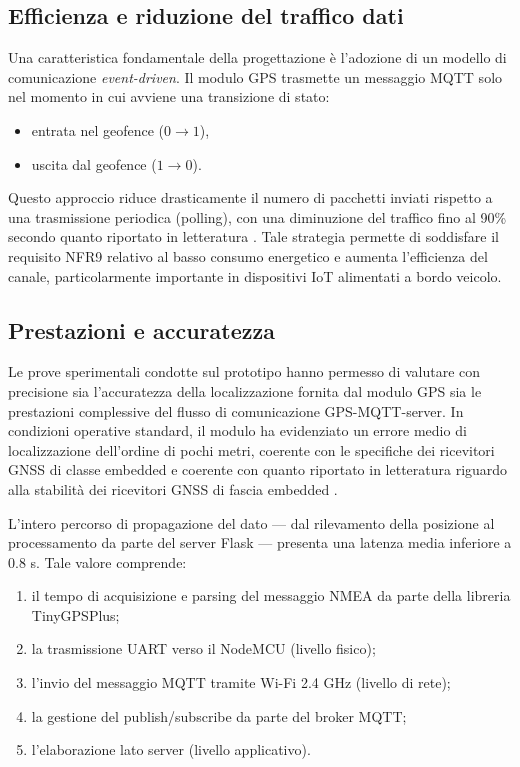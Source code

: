 \subsection*{Efficienza e riduzione del traffico dati}
Una caratteristica fondamentale della progettazione è l'adozione di un modello di comunicazione \textit{event-driven}. Il modulo GPS trasmette un messaggio MQTT solo nel momento in cui avviene una transizione di stato:
\begin{itemize}
    \item entrata nel geofence ($0 \rightarrow 1$),
    \item uscita dal geofence ($1 \rightarrow 0$).
\end{itemize}
Questo approccio riduce drasticamente il numero di pacchetti inviati rispetto a una trasmissione periodica (polling), con una diminuzione del traffico fino al 90\% secondo quanto riportato in letteratura \cite{Sanchez2018}. Tale strategia permette di soddisfare il requisito NFR9 relativo al basso consumo energetico e aumenta l'efficienza del canale, particolarmente importante in dispositivi IoT alimentati a bordo veicolo.


\subsection*{Prestazioni e accuratezza}
Le prove sperimentali condotte sul prototipo hanno permesso di valutare con precisione sia l'accuratezza della localizzazione fornita dal modulo GPS sia le prestazioni complessive del flusso di comunicazione GPS-MQTT-server.
In condizioni operative standard, il modulo ha evidenziato un errore medio di localizzazione dell’ordine di pochi metri,
coerente con le specifiche dei ricevitori GNSS di classe embedded e coerente con quanto riportato in letteratura riguardo alla stabilità dei ricevitori GNSS di fascia embedded \cite{Zanella2014}.

L'intero percorso di propagazione del dato — dal rilevamento della posizione al processamento da parte del server Flask — presenta una latenza media inferiore a 0.8 s. Tale valore comprende:
\begin{enumerate}
    \item il tempo di acquisizione e parsing del messaggio NMEA da parte della libreria TinyGPSPlus;
    \item la trasmissione UART verso il NodeMCU (livello fisico);
    \item l'invio del messaggio MQTT tramite Wi-Fi 2.4 GHz (livello di rete);
    \item la gestione del publish/subscribe da parte del broker MQTT;
    \item l'elaborazione lato server (livello applicativo).
\end{enumerate}

